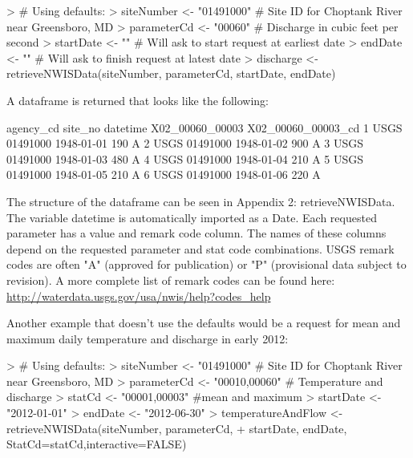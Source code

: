 \documentclass[a4paper,11pt]{article}
\begin{document}
\begin{Schunk}
\begin{Sinput}
> # Using defaults:
> siteNumber <- "01491000" # Site ID for Choptank River near Greensboro, MD
> parameterCd <- "00060"  # Discharge in cubic feet per second
> startDate <- ""  # Will ask to start request at earliest date
> endDate <- "" # Will ask to finish request at latest date
> discharge <- retrieveNWISData(siteNumber, parameterCd, startDate, endDate)
\end{Sinput}
\end{Schunk}

A dataframe is returned that looks like the following:
\begin{Schunk}
\begin{Soutput}
  agency_cd  site_no   datetime X02_00060_00003 X02_00060_00003_cd
1      USGS 01491000 1948-01-01             190                  A
2      USGS 01491000 1948-01-02             900                  A
3      USGS 01491000 1948-01-03             480                  A
4      USGS 01491000 1948-01-04             210                  A
5      USGS 01491000 1948-01-05             210                  A
6      USGS 01491000 1948-01-06             220                  A
\end{Soutput}
\end{Schunk}
The structure of the dataframe can be seen in Appendix 2: retrieveNWISData. The variable datetime is automatically imported as a Date. Each requested parameter has a value and remark code column.  The names of these columns depend on the requested parameter and stat code combinations. USGS remark codes are often "A" (approved for publication) or "P" (provisional data subject to revision). A more complete list of remark codes can be found here:
\url{http://waterdata.usgs.gov/usa/nwis/help?codes_help}

Another example that doesn't use the defaults would be a request for mean and maximum daily temperature and discharge in early 2012:
\begin{Schunk}
\begin{Sinput}
> # Using defaults:
> siteNumber <- "01491000" # Site ID for Choptank River near Greensboro, MD
> parameterCd <- "00010,00060"  # Temperature and discharge
> statCd <- "00001,00003"  #mean and maximum
> startDate <- "2012-01-01"
> endDate <- "2012-06-30"
> temperatureAndFlow <- retrieveNWISData(siteNumber, parameterCd, 
+                   startDate, endDate, StatCd=statCd,interactive=FALSE)
\end{Sinput}
\end{Schunk}
\end{document}
